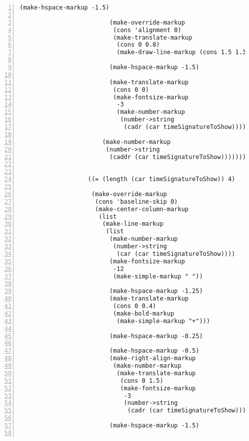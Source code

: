 \begin{Verbatim}[numbers=left,xleftmargin=5mm]
                         (make-hspace-markup -1.5)

                         (make-override-markup
                          (cons 'alignment 0)
                          (make-translate-markup
                           (cons 0 0.8)
                           (make-draw-line-markup (cons 1.5 1.35))))

                         (make-hspace-markup -1.5)

                         (make-translate-markup
                          (cons 0 0)
                          (make-fontsize-markup
                           -3
                           (make-number-markup
                            (number->string
                             (cadr (car timeSignatureToShow))))))))

                       (make-number-markup
                        (number->string
                         (caddr (car timeSignatureToShow))))))))


                   ((= (length (car timeSignatureToShow)) 4)

                    (make-override-markup
                     (cons 'baseline-skip 0)
                     (make-center-column-markup
                      (list
                       (make-line-markup
                        (list
                         (make-number-markup
                          (number->string
                           (car (car timeSignatureToShow))))
                         (make-fontsize-markup
                          -12
                          (make-simple-markup " "))

                         (make-hspace-markup -1.25)
                         (make-translate-markup
                          (cons 0 0.4)
                          (make-bold-markup
                           (make-simple-markup "+")))

                         (make-hspace-markup -0.25)

                         (make-hspace-markup -0.5)
                         (make-right-align-markup
                          (make-number-markup
                           (make-translate-markup
                            (cons 0 1.5)
                            (make-fontsize-markup
                             -3
                             (number->string
                              (cadr (car timeSignatureToShow)))))))

                         (make-hspace-markup -1.5)


\end{Verbatim}
